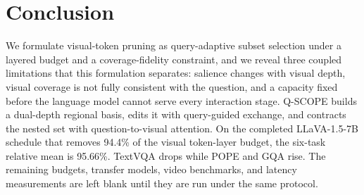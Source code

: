 \section{Conclusion}
We formulate visual-token pruning as query-adaptive subset selection under a layered budget and a coverage-fidelity constraint, and we reveal three coupled limitations that this formulation separates: salience changes with visual depth, visual coverage is not fully consistent with the question, and a capacity fixed before the language model cannot serve every interaction stage. Q-SCOPE builds a dual-depth regional basis, edits it with query-guided exchange, and contracts the nested set with question-to-visual attention. On the completed LLaVA-1.5-7B schedule that removes 94.4\% of the visual token-layer budget, the six-task relative mean is 95.66\%. TextVQA drops while POPE and GQA rise. The remaining budgets, transfer models, video benchmarks, and latency measurements are left blank until they are run under the same protocol.
